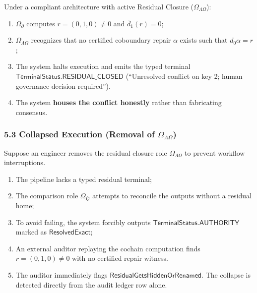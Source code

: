 \documentclass[
  10pt,
]{article}
\begin{document}
Under a compliant architecture with active Residual Closure (\hypertarget{math-E0028-0058}{}{\(\Omega_{\Lambda\Omega}\)}):

\begin{enumerate}
\def\labelenumi{\arabic{enumi}.}
\item
  \hypertarget{math-E0022-0059}{}{\(\Omega_{\partial}\)} computes \hypertarget{math-E0052-0060}{}{\(r = (0, 1, 0) \neq 0\)} and \hypertarget{math-E0053-0061}{}{\(\bar{d}_1(r) = 0\)};
\item
  \hypertarget{math-E0028-0062}{}{\(\Omega_{\Lambda\Omega}\)} recognizes that no certified coboundary repair \hypertarget{math-E0054-0063}{}{\(\alpha\)} exists such that \hypertarget{math-E0055-0064}{}{\(d_0\alpha = r\)};
\item
  The system halts execution and emits the typed terminal \hypertarget{math-E0056-0065}{}{\(\mathsf{TerminalStatus.RESIDUAL\_CLOSED}\)} (``Unresolved conflict on key 2; human governance decision required'').
\item
  The system \textbf{houses the conflict honestly} rather than fabricating consensus.
\end{enumerate}

\subsubsection[5.3 Collapsed Execution (Removal of )]{\texorpdfstring{5.3 Collapsed Execution (Removal of \protect\hypertarget{math-E0028-0066}{}{\(\Omega_{\Lambda\Omega}\)})}{5.3 Collapsed Execution (Removal of \textbackslash Omega\_\{\textbackslash Lambda\textbackslash Omega\})}}\label{collapsed-execution-removal-of-omega_lambdaomega}

Suppose an engineer removes the residual closure role \hypertarget{math-E0028-0067}{}{\(\Omega_{\Lambda\Omega}\)} to prevent workflow interruptions.

\begin{enumerate}
\def\labelenumi{\arabic{enumi}.}
\item
  The pipeline lacks a typed residual terminal;
\item
  The comparison role \hypertarget{math-E0026-0068}{}{\(\Omega_{\mathfrak{O}}\)} attempts to reconcile the outputs without a residual home;
\item
  To avoid failing, the system forcibly outputs \hypertarget{math-E0057-0069}{}{\(\mathsf{TerminalStatus.AUTHORITY}\)} marked as \hypertarget{math-E0058-0070}{}{\(\mathsf{ResolvedExact}\)};
\item
  An external auditor replaying the cochain computation finds \hypertarget{math-E0052-0071}{}{\(r = (0, 1, 0) \neq 0\)} with no certified repair witness.
\item
  The auditor immediately flags \hypertarget{math-E0059-0072}{}{\(\mathsf{ResidualGetsHiddenOrRenamed}\)}. The collapse is detected directly from the audit ledger row alone.
\end{enumerate}
\end{document}
